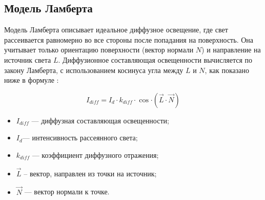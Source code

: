 %
%
%
%

\subsection{Модель Ламберта}

Модель Ламберта описывает идеальное диффузное освещение, где свет рассеивается равномерно во все стороны после попадания на поверхность. \cite{lightmodf} Она учитывает только ориентацию поверхности (вектор нормали $N$) и направление на источник света $L$. Диффузионное составляющая освещенности вычисляется по закону Ламберта, с использованием косинуса угла между $L$ и $N$, как показано ниже в формуле \cite{lightmodfv}:


\begin{equation}\label{lamber}
	I_{diff}=I_{d} \cdot k_{diff} \cdot \cos{\cdot (\vec L \cdot \vec N)}
\end{equation}

\begin{itemize}
	\item $I_{diff}​$ --- диффузная составляющая освещенности;
	\item $I_{d}$​ --- интенсивность рассеянного света;
	\item $k_{diff}​$ --- коэффициент диффузного отражения;
	\item $\vec L$ -- вектор, направлен из точки на источник;
	\item $\vec N$ --- вектор нормали к точке.
\end{itemize}

